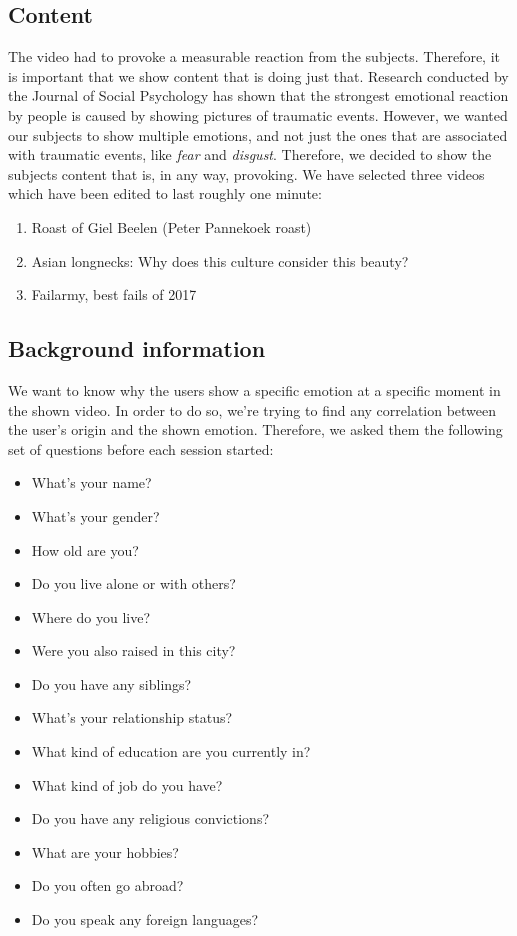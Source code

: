 \documentclass[sigconf]{acmart}
\begin{document}
\subsection{Content}
The video had to provoke a measurable reaction from the subjects. Therefore, it is important that we show content
that is doing just that. Research conducted by the Journal of Social Psychology \cite{leary2015seemingly}
has shown that the strongest emotional reaction by people is caused by showing pictures of traumatic events.
However, we wanted our subjects to show multiple emotions, and not just the ones that are associated with
traumatic events, like \emph{fear} and \emph{disgust}. Therefore, we decided to show the subjects content
that is, in any way, provoking. We have selected three videos which have been edited to last roughly one minute:
\begin{enumerate}
    \item{Roast of Giel Beelen (Peter Pannekoek roast)}
    \item{Asian longnecks: Why does this culture consider this beauty?}
    \item{Failarmy, best fails of 2017}
\end{enumerate}

\subsection{Background information}
We want to know why the users show a specific emotion at a specific moment in the shown video. In order to
do so, we're trying to find any correlation between the user's origin and the shown emotion. Therefore,
we asked them the following set of questions before each session started:
\begin{itemize}
    \item{What's your name?}
    \item{What's your gender?}
    \item{How old are you?}
    \item{Do you live alone or with others?}
    \item{Where do you live?}
    \item{Were you also raised in this city?}
    \item{Do you have any siblings?}
    \item{What's your relationship status?}
    \item{What kind of education are you currently in?}
    \item{What kind of job do you have?}
    \item{Do you have any religious convictions?}
    \item{What are your hobbies?}
    \item{Do you often go abroad?}
    \item{Do you speak any foreign languages?}
\end{itemize}
\end{document}
